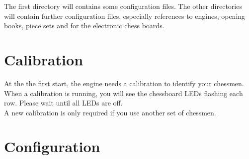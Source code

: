 \documentclass[11pt,a4paper]{article}
\begin{document}
The first directory will contains some configuration files. The other directories will contain further configuration files, especially references to engines, opening books, piece sets and for the electronic chess boards.

\section{Calibration}
At the the first start, the engine needs a calibration to identify your chessmen. When a calibration is running, you will see the chessboard LEDs flashing each row. Please wait until all LEDs are off.\\A new calibration is only required if you use another set of chessmen.

\section{Configuration}
\end{document}
